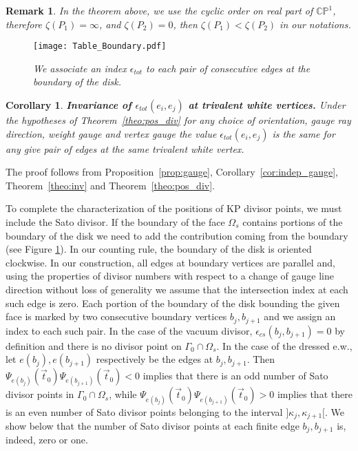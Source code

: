 \documentclass[11pt]{amsart}
\theoremstyle{plain}
\numberwithin{equation}{section}
\newtheorem{corollary}[theorem]{Corollary}
\newtheorem{remark}{Remark}[subsection]
\begin{document}
\begin{remark}
In the theorem above, we use the cyclic order on real part of $\mathbb{CP}^1$, therefore $\zeta(P_1)=\infty$, and  $\zeta(P_2)=0$, then $\zeta(P_1)<\zeta(P_2)$ in our notations.
\end{remark}

\begin{figure}%
  \centering
  \texttt{[image: Table\_Boundary.pdf]}
  \vspace{-1.9 truecm}
  \caption{\small{\sl We associate an index $\epsilon_{tot}$ to each pair of consecutive edges at the boundary of the disk.}}
	\label{fig:table_divisor3}
\end{figure}

\begin{corollary}
\label{cor:eps_tot}
\textbf{Invariance of $\epsilon_{tot}(e_i,e_j)$ at trivalent white vertices.} Under the hypotheses of Theorem~\ref{theo:pos_div} for any choice of orientation, gauge ray direction, weight gauge and vertex gauge the value  $\epsilon_{tot}(e_i,e_j)$ is the same for any give pair of edges at the same trivalent white vertex. 
\end{corollary}
The proof follows from Proposition~\ref{prop:gauge}, Corollary~\ref{cor:indep_gauge}, Theorem~\ref{theo:inv} and Theorem~\ref{theo:pos_div}.

To complete the characterization of the positions of KP divisor points, we must include the Sato divisor.
If the boundary of the face $\Omega_s$ contains portions of the boundary of the disk we need to add the contribution coming from the boundary 
(see Figure \ref{fig:table_divisor3}). In our counting rule, the boundary of the disk is oriented clockwise. In our construction, 
all edges at boundary vertices are parallel and, using the properties of divisor numbers with respect to a change of gauge line direction without loss of generality we assume that the intersection index at each such edge is zero. Each portion of the boundary of the disk bounding the given face is marked by two consecutive boundary vertices $b_j,b_{j+1}$
 and we assign an index to each such pair. In the case of the vacuum divisor, 
$\epsilon_{cs} (b_j,b_{j+1})=0$ by definition and there is no divisor point on $\Gamma_0\cap \Omega_s$. In the case of the dressed e.w., 
let $e(b_j),e(b_{j+1})$ respectively be the edges at $b_j,b_{j+1}$. Then $\Psi_{e(b_j)}(\vec t_0)\Psi_{e(b_{j+1})}(\vec t_0)<0$ implies that there is an odd number of Sato 
divisor points in $\Gamma_0\cap \Omega_s$, while $\Psi_{e(b_j)}(\vec t_0)\Psi_{e(b_{j+1})}(\vec t_0)>0$ implies that there is an even number of Sato divisor points 
belonging to the interval $]\kappa_j, \kappa_{j+1}[$. We show below that the number of Sato divisor points at each finite edge $b_j,b_{j+1}$ is, indeed, zero or one.
\end{document}
